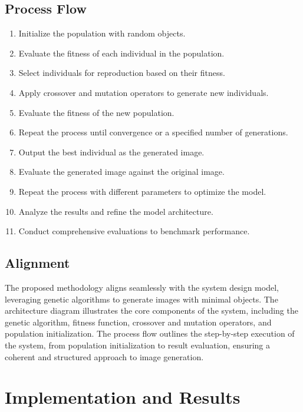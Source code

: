 \documentclass[10pt, conference]{IEEEtran}
\begin{document}
\subsection{Process Flow}
\begin{enumerate}
	\item Initialize the population with random objects.
	\item Evaluate the fitness of each individual in the population.
	\item Select individuals for reproduction based on their fitness.
	\item Apply crossover and mutation operators to generate new individuals.
	\item Evaluate the fitness of the new population.
	\item Repeat the process until convergence or a specified number of generations.
	\item Output the best individual as the generated image.
	\item Evaluate the generated image against the original image.
	\item Repeat the process with different parameters to optimize the model.
	\item Analyze the results and refine the model architecture.
	\item Conduct comprehensive evaluations to benchmark performance.
\end{enumerate}

\subsection{Alignment}
The proposed methodology aligns seamlessly with the system design model, leveraging genetic algorithms to generate images with minimal objects. The architecture diagram illustrates the core components of the system, including the genetic algorithm, fitness function, crossover and mutation operators, and population initialization. The process flow outlines the step-by-step execution of the system, from population initialization to result evaluation, ensuring a coherent and structured approach to image generation.

\section{Implementation and Results}
\end{document}
